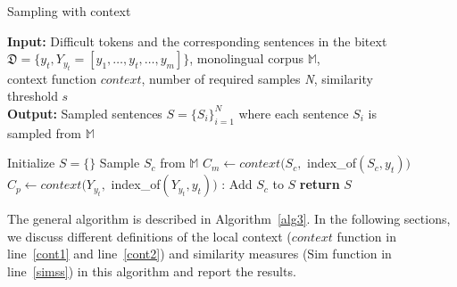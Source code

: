 {\centering
\begin{minipage}{.85\linewidth}
\begin{algorithm}[H]
\caption{Sampling with context}\label{alg3}
  \hspace*{\algorithmicindent} \textbf{Input:} Difficult tokens and the corresponding sentences  in the bitext \\
    \hspace*{\algorithmicindent}  \textit{$\mathfrak{D}=\{y_t, Y_{y_t}=[y_1, \ldots, y_t, \ldots, y_m]\}$},  monolingual corpus \textit{$\mathbb{M}$},  \\
      \hspace*{\algorithmicindent} context function \textit{$context$}, number of required samples \textit{N}, similarity \\
     \hspace*{\algorithmicindent} threshold $s$ \\
\hspace*{\algorithmicindent} \textbf{Output:} Sampled sentences $S=\{S_i\}_{i=1}^{N}$ where each sentence $S_i$ is \\
  \hspace*{\algorithmicindent} sampled from $\mathbb{M}$
 \begin{algorithmic}[1]
\State Initialize $S=\{\}$
\Repeat
\State Sample $S_c$ from $\mathbb{M}$
	\State $C_m \leftarrow context(S_c,$ index\_of$(S_c, y_t))$ \label{cont1}
		\State $C_p \leftarrow context(Y_{y_t},$  index\_of$(Y_{y_t}, y_t)) $ \label{cont2}
                         \State {}  \label{simss}:  Add $S_c$ to $S$
	\EndFor
\EndFor
{}
\State \textbf{return} $S$ %
\EndProcedure
\end{algorithmic}
\end{algorithm}
\end{minipage}
\par
}
\vspace{\baselineskip}%


The general algorithm is described in Algorithm~\ref{alg3}.
In the following sections, we discuss different definitions of the local context ($context$ function in line~\ref{cont1} and line~\ref{cont2}) and similarity measures ($\text{Sim}$ function in line~\ref{simss}) in this algorithm and report the results.

